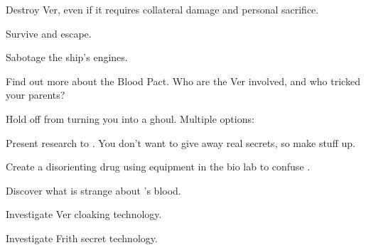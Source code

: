 \documentclass[char]{guildcamp4}
\begin{document}
\begin{itemz}[Goals]
	\item Destroy Ver, even if it requires collateral damage and personal sacrifice.
	\item Survive and escape.
	\item Sabotage the ship's engines.
	\item Find out more about the Blood Pact. Who are the Ver involved, and who tricked your parents?
	\item Hold off \cVone{} from turning you into a ghoul. Multiple options:
		\begin {itemz}
			\item Present research to \cVone{}. You don't want to give away real secrets, so make stuff up.
			\item Create a disorienting drug using equipment in the bio lab to confuse \cVone{\them}.
		\end {itemz}
	\item Discover what is strange about \cPlead{}'s blood.
	\item Investigate Ver cloaking technology.
	\item Investigate Frith secret technology.
\end{itemz}

\begin{itemz}[Notes]
	\item 
\end{itemz}

\begin{contacts}
	\contact{\cTest{}}
\end{contacts}
\end{document}
